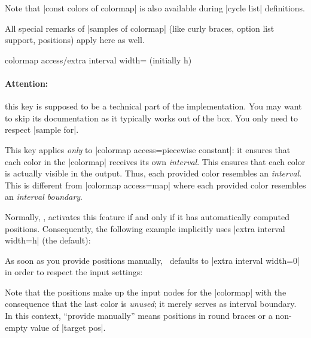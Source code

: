 {\begin{enumerate}
	Note that |const colors of colormap| is also available during |cycle list| definitions.

	All special remarks of |samples of colormap| (like curly braces, option list support, positions) apply here as well.
	
\end{enumerate}

\begin{pgfplotskey}{colormap access/extra interval width= (initially h)}
	\paragraph{Attention:} this key is supposed to be a technical part of the implementation. You may want to skip its documentation as it typically works out of the box. You only need to respect |sample for|.

	This key applies \emph{only} to |colormap access=piecewise constant|: it ensures that each color in the |colormap| receives its own \emph{interval}. This ensures that each color is actually visible in the output. Thus, each provided color resembles an \emph{interval}. This is different from |colormap access=map| where each provided color resembles an \emph{interval boundary}.

	Normally, \PGFPlots, activates this feature if and only if it has automatically computed positions. Consequently, the following example implicitly uses |extra interval width=h| (the default):
\begin{codeexample}[]
\pgfplotscolorbardrawstandalone[
	colormap={example}{%
		color=(blue)
		color=(red)
		color=(black)
	},
	colorbar horizontal,
	colorbar style={xtick=data},
	colormap access=const]
\end{codeexample}
	
	As soon as you provide positions manually, \PGFPlots\ defaults to |extra interval width=0| in order to respect the input settings:
\begin{codeexample}[]
\pgfplotscolorbardrawstandalone[
	colormap={example}{%
		color(0)=(blue)
		color(500)=(red)
		color(1000)=(black)
	},
	colorbar horizontal,
	colorbar style={xtick=data},
	colormap access=const]
\end{codeexample}
	\noindent Note that the positions make up the input nodes for the |colormap| with the consequence that the last color is \emph{unused}; it merely serves as interval boundary. In this context, ``provide manually'' means positions in round braces or a non-empty value of |target pos|. 
	

\end{pgfplotskey}}
